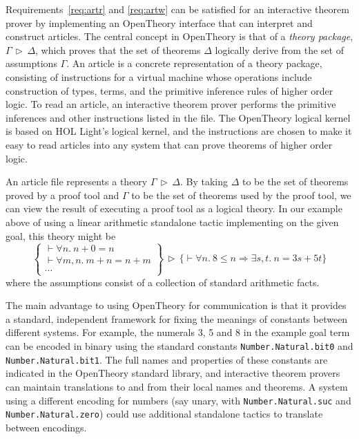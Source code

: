 \documentclass{llncs}
\newcommand{\OpenTheory}{OpenTheory\xspace}
\newcommand{\theory}[2]{{#1}\,\triangleright\,{#2}}
\begin{document}
Requirements~\ref{req:artr} and \ref{req:artw} can be satisfied for an interactive theorem prover by implementing an \OpenTheory interface that can interpret and construct articles.
The central concept in \OpenTheory is that of a \emph{theory package}, $\theory{\Gamma}{\Delta}$, which proves that the set of theorems $\Delta$ logically derive from the set of assumptions $\Gamma$. An article is a concrete representation of a theory package, consisting of instructions for a virtual machine whose operations include construction of types, terms, and the primitive inference rules of higher order logic. To read an article, an interactive theorem prover performs the primitive inferences and other instructions listed in the file. The \OpenTheory logical kernel is based on HOL Light's logical kernel, and the instructions are chosen to make it easy to read articles into any system that can prove theorems of higher order logic.

An article file represents a theory $\theory{\Gamma}{\Delta}$.
By taking $\Delta$ to be the set of theorems proved by a proof tool and $\Gamma$ to be the set of theorems used by the proof tool, we can view the result of executing a proof tool as a logical theory.
In our example above of using a linear arithmetic standalone tactic implementing on the given goal, this theory might be
\[
\theory{\left\{\begin{array}{l}
\vdash\forall n.\ n + 0 = n \\
\vdash\forall m,n.\ m + n = n + m \\
\cdots
\end{array}\right\}}
{\bigl\{\vdash\forall n.\ 8\le n\Rightarrow\exists s,t.\ n = 3s + 5t\bigr\}}
\]
where the assumptions consist of a collection of standard arithmetic facts.


The main advantage to using \OpenTheory for communication is that it provides a standard, independent framework for fixing the meanings of constants between different systems.
For example, the numerals 3, 5 and 8 in the example goal term can be encoded in binary using the standard constants \texttt{Number.Natural.bit0} and \texttt{Number.Natural.bit1}.
The full names and properties of these constants are indicated in the \OpenTheory standard library, and interactive theorem provers can maintain translations to and from their local names and theorems.
A system using a different encoding for numbers (say unary, with \texttt{Number.Natural.suc} and \texttt{Number.Natural.zero}) could use additional standalone tactics to translate between encodings.
\end{document}
